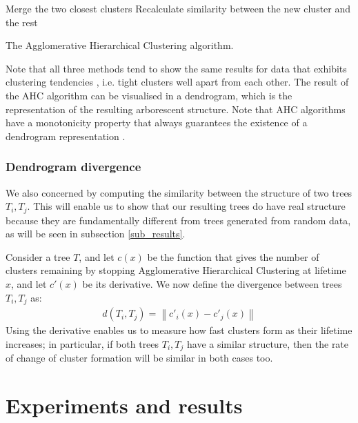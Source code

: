 \documentclass[pdftex,11pt,a4paper]{article}
\theoremstyle{definition}
\theoremstyle{remark}
\newcommand{\norm}[1]{\left\lVert#1\right\rVert}
\begin{document}
\begin{algorithm}
\begin{algorithmic}[1]
\Repeat
\State Merge the two closest clusters
\State Recalculate similarity between the new cluster and the rest
\EndFunction
\caption{The Agglomerative Hierarchical Clustering algorithm.}\label{alg_ahc}
\end{algorithmic}
\end{algorithm}
\par Note that all three methods tend to show the same results for data that exhibits clustering tendencies \cite{hastie2008}, i.e. tight clusters well apart from each other. The result of the AHC algorithm can be visualised in a dendrogram, which is the representation of the resulting arborescent structure. Note that AHC algorithms have a monotonicity property that always guarantees the existence of a dendrogram representation \cite{hastie2008}.

\subsubsection{Dendrogram divergence}
\label{subsub_divergence}
We also concerned by computing the similarity between the structure of two trees $T_i, T_j$. This will enable us to show that our resulting trees do have real structure because they are fundamentally different from trees generated from random data, as will be seen in subsection \ref{sub_results}.
\par Consider a tree $T$, and let $c(x)$ be the function that gives the number of clusters remaining by stopping Agglomerative Hierarchical Clustering at lifetime $x$, and let $c'(x)$ be its derivative. We now define the divergence between trees $T_i, T_j$ as:
\begin{align*}
d(T_i, T_j) = \norm{c'_i(x) - c'_j(x)}
\end{align*}
Using the derivative enables us to measure how fast clusters form as their lifetime increases; in particular, if both trees $T_i, T_j$ have a similar structure, then the rate of change of cluster formation will be similar in both cases too.

\section{Experiments and results}
\label{section_results}
\end{document}
